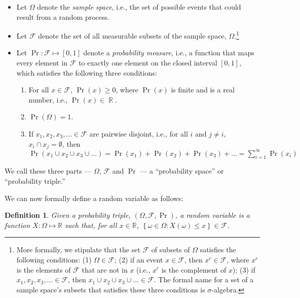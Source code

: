 \documentclass[12pt,leqno]{article}
\theoremstyle{newstyle}
\newtheorem{definition}{Definition}
\DeclareMathOperator{\R}{\mathbb{R}}
\begin{document}
\begin{itemize}

\item Let $\Omega$ denote the \textit{sample space}, i.e., the set of possible events that could result from a random process.

\item Let $\mathcal{F}$ denote the set of all measurable subsets of the sample space, $\Omega$.\footnote{More formally, we stipulate that the set $\mathcal{F}$ of subsets of $\Omega$ satisfies the following conditions: (1) $\Omega \in \mathcal{F}$; (2) if an event $x \in \mathcal{F}$, then $x^c \in \mathcal{F}$, where $x^c$ is the elements of $\mathcal{F}$ that are not in $x$ (i.e., $x^c$ is the complement of $x$); (3) if $x_1, x_2, x_3, \dots \in \mathcal{F}$, then $x_1 \cup x_2 \cup x_3 \cup \dots \in \mathcal{F}$. The formal name for a set of a sample space's subsets that satisfies these three conditions is $\sigma$-algebra.}

\item Let $\Pr: \mathcal{F} \mapsto [0, 1]$ denote a \textit{probability measure}, i.e., a function that maps every element in $\mathcal{F}$ to exactly one element on the closed interval $[0, 1]$, which satisfies the following three conditions:
\begin{enumerate}
\item For all $x \in \mathcal{F}$, $\Pr(x) \geq 0$, where $\Pr(x)$ is finite and is a real number, i.e., $\Pr(x) \in \R$.
\item $\Pr(\Omega) = 1$.
\item If $x_1, x_2, x_3, \dots \in \mathcal{F}$ are pairwise disjoint, i.e., for all $i$ and $j \neq i$, $x_i \cap x_j = \emptyset$, then $\Pr\left(x_1 \cup x_2 \cup x_3 \cup \dots\right) = \Pr(x_1) + \Pr(x_2) + \Pr(x_3) + \dots = \sum \limits_{i = 1}^{\infty} \Pr(x_i)$
\end{enumerate}
\end{itemize}

We call these three parts --- \(\Omega\), \(\mathcal{F}\) and \(\Pr\)
--- a \enquote{probability space} or \enquote{probability triple.}

We can now formally define a random variable as follows:

\begin{definition}
Given a probability triple, $\left(\Omega, \mathcal{F}, \Pr\right)$, a random variable is a function $X: \Omega \mapsto \mathbb{R}$ such that, for all $x \in \mathbb{R}$, $\left\{\omega \in \Omega: X\left(\omega\right) \leq x \right\} \in \mathcal{F}$.
\end{definition}
\end{document}
